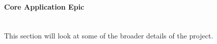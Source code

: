 \begin{figure}[!htbp]
\centering
{}
\end{figure}

\paragraph{Core Application Epic}\mbox{}\\
This section will look at some of the broader details of the project. 

\begin{figure}[!htbp]
\centering
{}
\end{figure}
